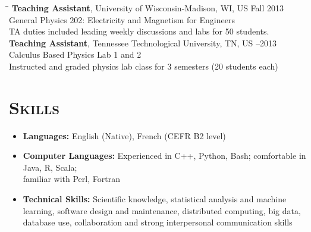 \documentclass[10pt]{res} %
\begin{document}
\begin{resume}
\begin{tabbing}
\hspace{3.5 in}\= \hspace{1.4in}\= \kill %
\textbf{Teaching Assistant}, University of Wisconsin-Madison, WI, US \>\> Fall 2013 \\
General Physics 202: Electricity and Magnetism for Engineers \\
TA duties included leading weekly discussions and labs for 50 students. \\
\textbf{Teaching Assistant}, Tennessee Technological University, TN, US \>--2013 \\
Calculus Based Physics Lab 1 and 2 \\
Instructed and graded physics lab class for 3 semesters (20 students each) \\
\end{tabbing}\vspace{-20pt}      %

\section{\textsc{Skills}}
\begin{itemize}
\item \textbf{Languages:} English (Native), French (CEFR B2 level)
\item \textbf{Computer Languages:} Experienced in C++, Python, Bash; comfortable in Java, R, Scala; \\ familiar with Perl, Fortran
\item \textbf{Technical Skills:} Scientific knowledge, statistical analysis and machine learning, software design and maintenance, distributed computing, big data, database use, collaboration and strong interpersonal communication skills
\end{itemize} 

\end{resume}
\end{document}
